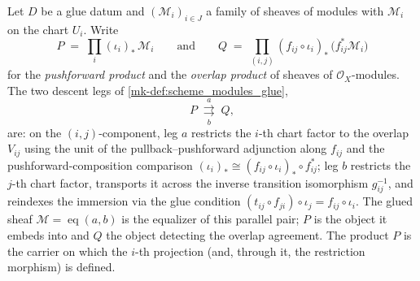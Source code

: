 \begin{definition}\label{mk-def:gr_glue_equalizer}
  \leanok

  Let \(D\) be a glue datum and \((\mathcal{M}_i)_{i \in J}\) a family of sheaves of
  modules with \(\mathcal{M}_i\) on the chart \(U_i\). Write
  \[
    P \;=\; \prod_{i} (\iota_i)_{*}\,\mathcal{M}_i
    \qquad\text{and}\qquad
    Q \;=\; \prod_{(i,j)} (f_{ij} \circ \iota_i)_{*}\,\bigl(f_{ij}^{*}\mathcal{M}_i\bigr)
  \]
  for the \emph{pushforward product} and the \emph{overlap product} of sheaves of
  \(\mathcal{O}_X\)-modules. The two descent legs of \ref{mk-def:scheme_modules_glue},
  \[
    P \;\underset{b}{\overset{a}{\rightrightarrows}}\; Q,
  \]
  are: on the \((i,j)\)-component, leg \(a\) restricts the \(i\)-th chart factor to
  the overlap \(V_{ij}\) using the unit of the pullback--pushforward adjunction along
  \(f_{ij}\) and the pushforward-composition comparison
  \((\iota_i)_{*} \cong (f_{ij} \circ \iota_i)_{*} \circ f_{ij}^{*}\); leg \(b\)
  restricts the \(j\)-th chart factor, transports it across the inverse transition
  isomorphism \(g_{ij}^{-1}\), and reindexes the immersion via the glue condition
  \((t_{ij} \circ f_{ji}) \circ \iota_j = f_{ij} \circ \iota_i\). The glued sheaf
  \(\mathcal{M} = \operatorname{eq}(a,b)\) is the equalizer of this parallel pair;
  \(P\) is the object it embeds into and \(Q\) the object detecting the overlap
  agreement. The product \(P\) is the carrier on which the \(i\)-th projection (and,
  through it, the restriction morphism) is defined.
\end{definition}

